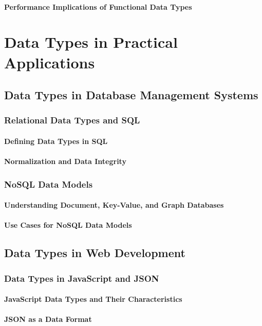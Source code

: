 \documentclass[12pt, oneside]{book}
\begin{document}
\subsubsection{Performance Implications of Functional Data Types}

\chapter{Data Types in Practical Applications}
\section{Data Types in Database Management Systems}
\subsection{Relational Data Types and SQL}
\subsubsection{Defining Data Types in SQL}
\subsubsection{Normalization and Data Integrity}
\subsection{NoSQL Data Models}
\subsubsection{Understanding Document, Key-Value, and Graph Databases}
\subsubsection{Use Cases for NoSQL Data Models}
\section{Data Types in Web Development}
\subsection{Data Types in JavaScript and JSON}
\subsubsection{JavaScript Data Types and Their Characteristics}
\subsubsection{JSON as a Data Format}
\end{document}
